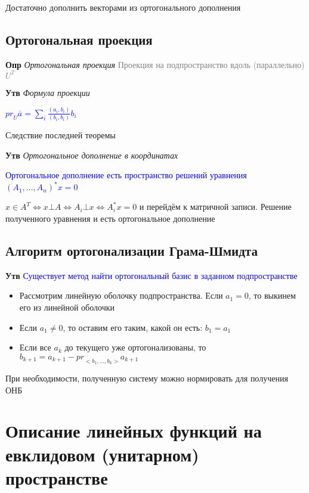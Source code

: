 \documentclass[a4paper, 14pt]{article}
\begin{document}
    Достаточно дополнить векторами из ортогонального дополнения
    
    \subsection{Ортогональная проекция}
    
    \textbf{Опр} \textit{Ортогональная проекция} \textcolor{gray}{Проекция на подпространство вдоль (параллельно) $U^T$}
    
    \textbf{Утв} \textit{Формула проекции}
    
    \textcolor{blue}{${pr}_U \overline{a} = \sum_i \frac{(a_i, b_i)}{(b_i, b_i)} b_i$}
    
    Следствие последней теоремы
    
    \textbf{Утв} \textit{Ортогональное дополнение в координатах}
    
    \textcolor{blue}{Ортогональное дополнение есть пространство решений уравнения $(A_1, \dots, A_n)^* x = 0$}
    
    $x \in A^T \Leftrightarrow x \bot A \Leftrightarrow A_i \bot x \Leftrightarrow A_i^* x = 0$ и перейдём к матричной
    записи.
    Решение полученного уравнения и есть ортогональное дополнение
    
    \subsection{Алгоритм ортогонализации Грама-Шмидта}
    
    \textbf{Утв} \textcolor{blue}{Существует метод найти ортогональный базис в заданном подпространстве}
    
    \begin{itemize}
        \item Рассмотрим линейную оболочку подпространства.
        Если $a_1 = 0$, то выкинем его из линейной оболочки
        \item Если $a_1 \neq 0$, то оставим его таким, какой он есть: $b_1 = a_1$
        \item Если все $a_k$ до текущего уже ортогонализованы, то $b_{k+1} = a_{k+1} - {pr}_{<b_1, \dots, b_k>} a_{k+1}$
    \end{itemize}
    
    При необходимости, полученную систему можно нормировать для получения ОНБ
    
    \section{Описание линейных функций на евклидовом (унитарном) пространстве}
    
\end{document}
